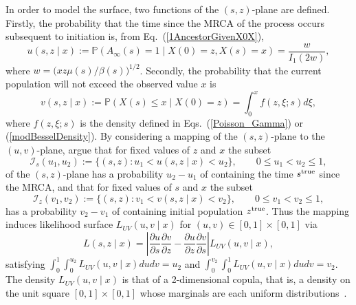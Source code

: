 \documentclass[preprint,12pt]{elsarticle}
\begin{document}
In order to model the surface, two functions of the $(s, z)$-plane are defined.  Firstly, the probability that the time since the MRCA of the process 
occurs subsequent to initiation is, from Eq.~(\ref{1AncestorGivenX0X}),   
\[
u(s, z \mid x) := \mathbb{P}(A_\infty(s) = 1 \mid X(0) = z, X(s) = x) = \frac{w}{I_1(2w)}, 
\]
where $w = \big(xz\mu(s)/\beta(s)\big)^{1/2}$.  Secondly, the probability that the current population will not exceed the observed value $x$ is 
\[
v(s, z \mid x) := \mathbb{P}(X(s) \le x \mid X(0) = z) = \int_0^x f(z, \xi; s) d\xi, 
\]
where $f(z, \xi; s)$ is the density defined in Eqs.~(\ref{Poisson_Gamma}) or (\ref{modBesselDensity}).  
By considering a mapping of the $(s, z)$-plane to the $(u, v)$-plane, \citet[Figure~2 and Proposition~1]{BurdenSoewongsoso19} argue that for 
fixed values of $z$ and $x$ the subset  
\[
\mathcal{I}_s(u_1, u_2) := \{(s, z): u_1 < u(s, z \mid x) < u_2\}, \qquad 0 \le u_1 < u_2 \le 1, 
\]
of the $(s, z)$-plane has a probability $u_2 - u_1$ of containing the time $s^{\rm true}$ since the MRCA, and that for fixed values of $s$ and $x$ the subset 
\[
\mathcal{I}_z(v_1, v_2) := \{(s, z): v_1 < v(s, z \mid x) < v_2\},  \qquad 0 \le v_1 < v_2 \le 1, 
\]
has a probability $v_2 - v_1$ of containing initial population $z^{\rm true}$.  Thus the mapping induces likelihood surface $L_{UV}(u, v \mid x)$ 
for $(u, v) \in [0, 1] \times [0, 1]$ via  
\[
L(s, z \mid x) = \left| \frac{\partial u}{\partial s}\frac{\partial v}{\partial z} - \frac{\partial u}{\partial z}\frac{\partial v}{\partial s} \right| L_{UV}(u, v \mid x), 
\]
satisfying $\int_0^1\int_0^{u_2} L_{UV}(u, v \mid x) dudv = u_2$ and $\int_0^{v_2}\int_0^1 L_{UV}(u, v \mid x) dudv = v_2$. 
The density $L_{UV}(u, v \mid x)$ is that of a 2-dimensional copula, that is, a density on the unit square $[0, 1] \times [0, 1]$ whose marginals are each 
uniform distributions~\citep[Section~2]{Nelsen:2006aa}.   
\end{document}
